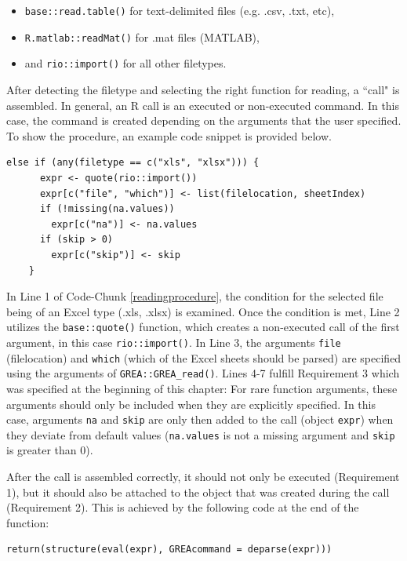 \documentclass[12pt]{article} %
\newcommand{\li}{\lstinline}
\begin{document}
\begin{itemize}
\item \li{base::read.table()} for text-delimited files (e.g. .csv, .txt, etc),
\item \li{R.matlab::readMat()} for .mat files (MATLAB),
\item and \li{rio::import()} for all other filetypes.
\end{itemize}

After detecting the filetype and selecting the right function for reading, a ``call" is assembled. In general, an R call is an executed or non-executed command. In this case, the command is created depending on the arguments that the user specified. To show the procedure, an example code snippet is provided below.

\begin{lstlisting}[caption = Reading procedure of \li{GREA_read()}, label = readingprocedure]
else if (any(filetype == c("xls", "xlsx"))) {
      expr <- quote(rio::import())
      expr[c("file", "which")] <- list(filelocation, sheetIndex)
      if (!missing(na.values))
        expr[c("na")] <- na.values
      if (skip > 0)
        expr[c("skip")] <- skip
    }
\end{lstlisting}

In Line 1 of Code-Chunk \ref{readingprocedure}, the condition for the selected file being of an Excel type (.xls, .xlsx) is examined. Once the condition is met, Line 2 utilizes the \li{base::quote()} function, which creates a non-executed call of the first argument, in this case \li{rio::import()}. In Line 3, the arguments \li{file} (filelocation) and \li{which} (which of the Excel sheets should be parsed) are specified using the arguments of \li{GREA::GREA_read()}. Lines 4-7 fulfill Requirement 3 which was specified at the beginning of this chapter: For rare function arguments, these arguments should only be included when they are explicitly specified. In this case, arguments \li{na} and \li{skip} are only then added to the call (object \li{expr}) when they deviate from default values (\li{na.values} is not a missing argument and \li{skip} is greater than 0).

After the call is assembled correctly, it should not only be executed (Requirement 1), but it should also be attached to the object that was created during the call (Requirement 2). This is achieved by the following code at the end of the function:
\begin{lstlisting}[caption = Return Command of the \li{GREA_read()} function, label = returnread]
return(structure(eval(expr), GREAcommand = deparse(expr)))
\end{lstlisting}
\end{document}

